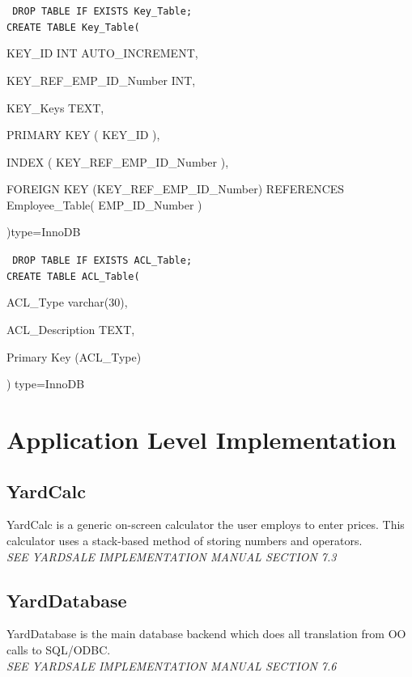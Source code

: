 \documentclass{report}
\begin{document}
        {\tt\small
        DROP TABLE IF EXISTS Key\_Table;\\

        CREATE TABLE Key\_Table(
        \begin{list}{}
            \item{KEY\_ID                          INT AUTO\_INCREMENT,}
            \item{KEY\_REF\_EMP\_ID\_Number        INT,}
            \item{KEY\_Keys                        TEXT,}
            \item{PRIMARY KEY ( KEY\_ID ),}
            \item{INDEX ( KEY\_REF\_EMP\_ID\_Number ),}
            \item{FOREIGN KEY (KEY\_REF\_EMP\_ID\_Number) REFERENCES Employee\_Table( EMP\_ID\_Number )}
        \end{list}
        )type=InnoDB\\
        }

        {\tt\small
        DROP TABLE IF EXISTS ACL\_Table;\\

        CREATE TABLE ACL\_Table(
        \begin{list}{}
            \item{ACL\_Type varchar(30),}
            \item{ACL\_Description TEXT,}
            \item{Primary Key (ACL\_Type)}
        \end{list}
        ) type=InnoDB\\
        }

    \section{Application Level Implementation}

        \subsection{YardCalc}
        YardCalc is a generic on-screen calculator the user employs to
        enter prices.  This calculator uses a stack-based method of
        storing numbers and operators.\\
        {\sl SEE YARDSALE IMPLEMENTATION MANUAL SECTION 7.3}

        \subsection{YardDatabase}
        YardDatabase is the main database backend which does all
        translation from OO calls to SQL/ODBC.\\
        {\sl SEE YARDSALE IMPLEMENTATION MANUAL SECTION 7.6}
\end{document}
